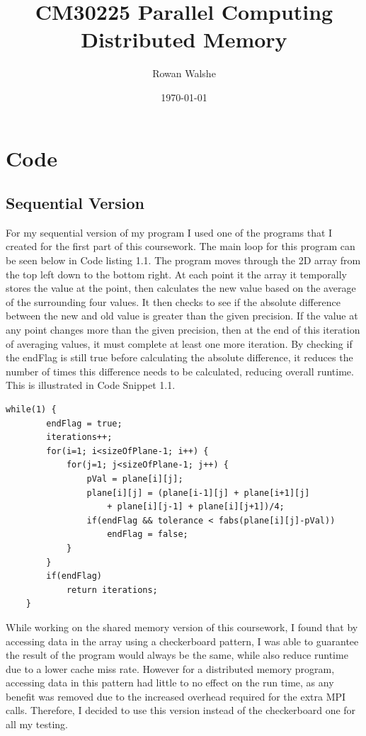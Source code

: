 \documentclass{report}
\title{CM30225 Parallel Computing\\Distributed Memory} %
\author{Rowan Walshe} %
\date{\today} %
\begin{document}
\maketitle %
\pagebreak

\chapter{Code}

\section{Sequential Version}
For my sequential version of my program I used one of the programs that I created for the first part of this coursework. The main loop for this program can be seen  below in Code listing 1.1. The program moves through the 2D array from the top left down to the bottom right. At each point it the array it temporally stores the value at the point, then calculates the new value based on the average of the surrounding four values. It then checks to see if the absolute difference between the new and old value is greater than the given precision. If the value at any point changes more than the given precision, then at the end of this iteration of averaging values, it must complete at least one more iteration. By checking if the endFlag is still true before calculating the absolute difference, it reduces the number of times this difference needs to be calculated, reducing overall runtime. This is illustrated in Code Snippet 1.1.
\begin{lstlisting}[style=customc,caption=Version 1 Sequential Main Loop]
    while(1) {
        endFlag = true;
        iterations++;
        for(i=1; i<sizeOfPlane-1; i++) {
            for(j=1; j<sizeOfPlane-1; j++) {
                pVal = plane[i][j];
                plane[i][j] = (plane[i-1][j] + plane[i+1][j]
                    + plane[i][j-1] + plane[i][j+1])/4;
                if(endFlag && tolerance < fabs(plane[i][j]-pVal))
                    endFlag = false;
            }
        }
        if(endFlag)
            return iterations;
    }
\end{lstlisting}
While working on the shared memory version of this coursework, I found that by accessing data in the array using a checkerboard pattern, I was able to guarantee the result of the program would always be the same, while also reduce runtime due to a lower cache miss rate. However for a distributed memory program, accessing data in this pattern had little to no effect on the run time, as any benefit was removed due to the increased overhead required for the extra MPI calls. Therefore, I decided to use this version instead of the checkerboard one for all my testing.
\end{document}
